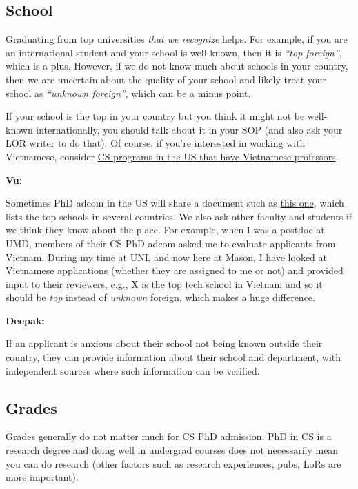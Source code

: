 \documentclass[oneside,11pt,dvipsnames]{book}
\newenvironment{commentbox}[1][]{
  \small
  \begin{mybox}
    {\small \textbf{#1}}
  }{
  \end{mybox}
}
\begin{document}
\subsection{School} Graduating from top universities \emph{that we recognize} helps. For example, if you are an international student and your school is well-known, then it is \emph{``top foreign''}, which is a plus.
However, if we do not know much about schools in your country, then we are uncertain about the quality of your school and likely treat your school as \emph{``unknown foreign''}, which can be a minus point.


If your school is the top in your country but you think it might not be well-known internationally, you should talk about it in your SOP (and also ask your LOR writer to do that). Of course, if you're interested in working with Vietnamese, consider  \href{https://github.com/dynaroars/dynaroars.github.io/wiki/Viet-CS-Profs-US}{CS programs in the US that have Vietnamese professors}. %

\begin{commentbox}[Vu:]
  Sometimes PhD adcom in the US will share a document such as \href{https://github.com/dynaroars/dynaroars.github.io/wiki/Foreign-Top-Schools}{this one}, which lists the top schools in several countries. We also ask other faculty and students if we think they know about the place.  For example, when I was a postdoc at UMD, members of their CS PhD adcom asked me to evaluate applicants from Vietnam.  During my time at UNL and now here at Mason, I have looked at Vietnamese applications (whether they are assigned to me or not) and provided input to their reviewers, e.g., X is the top tech school in Vietnam and so it should be \emph{top} instead of \emph{unknown} foreign, which makes a huge difference.
\end{commentbox}
\begin{commentbox}[Deepak:]
  If an applicant is anxious about their school not being known outside their country, they can provide information about their school and department, with independent sources where such information can be verified.
\end{commentbox}

\subsection{Grades} Grades generally do not matter much for CS PhD admission. PhD in CS is a research degree and doing well in undergrad courses does not necessarily mean you can do research (other factors such as research experiences, pubs, LoRs are more important).
\end{document}
